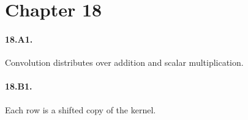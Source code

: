 \section*{Chapter 18}
\paragraph{18.A1.} Convolution distributes over addition and scalar multiplication.
\paragraph{18.B1.} Each row is a shifted copy of the kernel.
